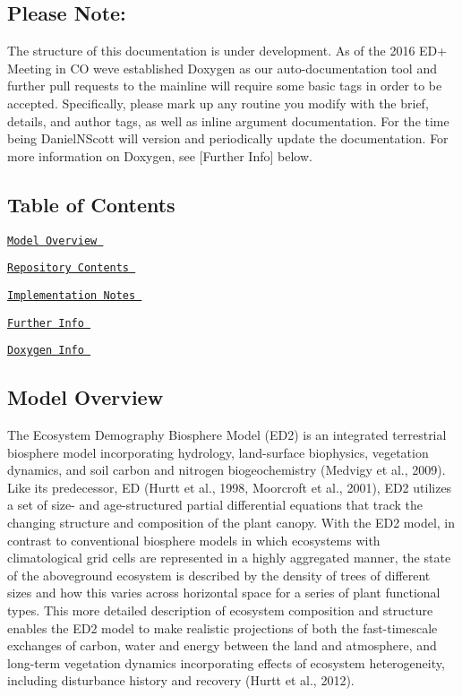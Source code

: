 \subsection*{Please Note\+:}

The structure of this documentation is under development. As of the 2016 E\+D+ Meeting in CO we\textquotesingle{}ve established Doxygen as our auto-\/documentation tool and further pull requests to the mainline will require some basic tags in order to be accepted. Specifically, please mark up any routine you modify with the brief, details, and author tags, as well as inline argument documentation. For the time being Daniel\+N\+Scott will version and periodically update the documentation. For more information on Doxygen, see \mbox{[}Further Info\mbox{]} below.

\subsection*{Table of Contents}


\begin{DoxyEnumerate}
\item \href{#overview}{\tt Model Overview }
\item \href{#contents}{\tt Repository Contents }
\item \href{#implementation}{\tt Implementation Notes }
\item \href{#info}{\tt Further Info }
\begin{DoxyEnumerate}
\item \href{#doxyinfo}{\tt Doxygen Info }
\end{DoxyEnumerate}
\end{DoxyEnumerate}

\subsection*{\label{_overview}%
 Model Overview }

The Ecosystem Demography Biosphere Model (E\+D2) is an integrated terrestrial biosphere model incorporating hydrology, land-\/surface biophysics, vegetation dynamics, and soil carbon and nitrogen biogeochemistry (Medvigy et al., 2009). Like its predecessor, ED (Hurtt et al., 1998, Moorcroft et al., 2001), E\+D2 utilizes a set of size-\/ and age-\/structured partial differential equations that track the changing structure and composition of the plant canopy. With the E\+D2 model, in contrast to conventional biosphere models in which ecosystems with climatological grid cells are represented in a highly aggregated manner, the state of the aboveground ecosystem is described by the density of trees of different sizes and how this varies across horizontal space for a series of plant functional types. This more detailed description of ecosystem composition and structure enables the E\+D2 model to make realistic projections of both the fast-\/timescale exchanges of carbon, water and energy between the land and atmosphere, and long-\/term vegetation dynamics incorporating effects of ecosystem heterogeneity, including disturbance history and recovery (Hurtt et al., 2012).

